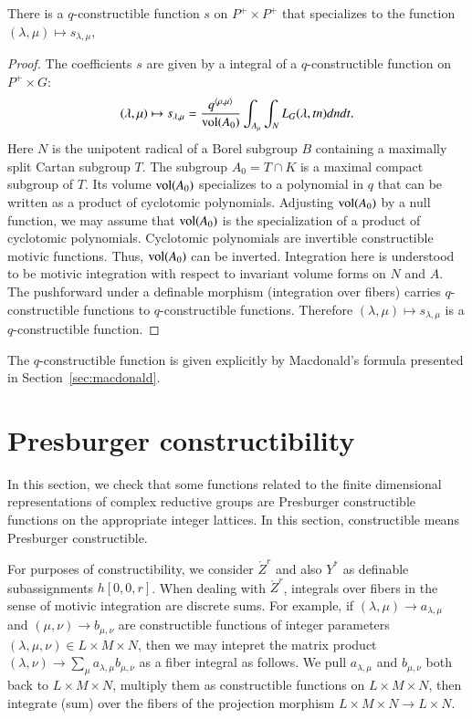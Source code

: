 \begin{lemma}\label{lemma:satake} 
  There is a $q$-constructible function $s$ on $P^+\times P^+$ that
  specializes to the function $(\lambda,\mu)\mapsto s_{\lambda,\mu}$,
\end{lemma}

\begin{proof} 
  The coefficients $s$ are given by a integral of a $q$-constructible
  function on $P^+\times G$:
\begin{equation}\label{eqn:s}
(\lambda,\mu)\mapsto s_{\lambda,\mu}
=\frac{q^{\langle\rho,\mu\rangle}}{{\operatorname{vol}}(A_0)} 
\int_{A_\mu} \int_N L_G(\lambda,t n) dn dt.
\end{equation}
Here $N$ is the unipotent radical of a Borel subgroup $B$ containing a
maximally split Cartan subgroup $T$.  The subgroup $A_0 = T\cap K$ is
a maximal compact subgroup of $T$.  Its volume ${\operatorname{vol}}(A_0)$
specializes to a polynomial in $q$ that can be written as a product of
cyclotomic polynomials.  Adjusting ${\operatorname{vol}}(A_0)$ by a null function,
we may assume that ${\operatorname{vol}}(A_0)$ is the specialization of a product
of cyclotomic polynomials.  Cyclotomic polynomials are invertible
constructible motivic functions.  Thus, ${\operatorname{vol}}(A_0)$ can be
inverted.  Integration here is understood to be motivic integration
with respect to invariant volume forms on $N$ and $A$.  The
pushforward under a definable morphism (integration over fibers)
carries $q$-constructible functions to $q$-constructible functions.
Therefore $(\lambda,\mu)\mapsto s_{\lambda,\mu}$ is a
$q$-constructible function.
\end{proof}

The $q$-constructible function is given explicitly by Macdonald's
formula presented in Section~\ref{sec:macdonald}.


\section{Presburger constructibility}

In this section, we check that some functions related to the finite
dimensional representations of complex reductive groups are Presburger
constructible functions on the appropriate integer lattices.  In this
section, constructible means Presburger constructible.

\begin{remark}\label{rem:matrix}
  For purposes of constructibility, we consider $\ring{Z}^r$ and also
  $Y^*$ as definable subassignments $h[0,0,r]$. When dealing with
  $\ring{Z}^r$, integrals over fibers in the sense of motivic
  integration are discrete sums.  For example, if $(\lambda,\mu)\to
  a_{\lambda,\mu}$ and $(\mu,\nu)\to b_{\mu,\nu}$ are constructible
  functions of integer parameters $(\lambda,\mu,\nu)\in L\times
  M\times N$, then we may intepret the matrix product
  $(\lambda,\nu)\to \sum_{\mu} a_{\lambda,\mu} b_{\mu,\nu}$ as a fiber
  integral as follows.  We pull $a_{\lambda,\mu}$ and $b_{\mu,\nu}$
  both back to $L\times M\times N$, multiply them as constructible
  functions on $L\times M\times N$, then integrate (sum) over the
  fibers of the projection morphism $L\times M\times N\to L\times N$.
\end{remark}


